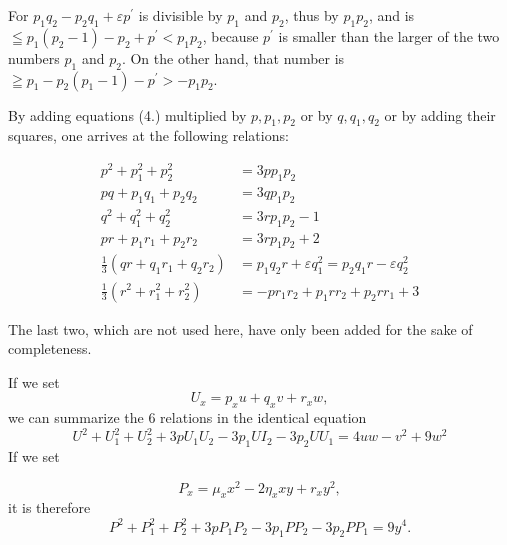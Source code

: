 \documentclass[12pt]{article}
\begin{document}
For $p_{1} q_{2}-p_{2} q_{1}+\varepsilon p^{\prime}$ is divisible by $p_{1}$ and $p_{2}$, thus by $p_{1} p_{2}$, and is $\leqq p_{1}\left(p_{2}-1\right)-p_{2}+p^{\prime}<p_{1} p_{2}$, because $p^{\prime}$ is smaller than the larger of the two numbers $p_{1}$ and $p_{2}$. On the other hand, that number is $\geqq p_{1}-p_{2}\left(p_{1}-1\right)-p^{\prime} >-p_{1} p_{2}$.

By adding equations (4.) multiplied by $p, p_{1}, p_{2}$ or by $q, q_{1}, q_{2}$ or by adding their squares, one arrives at the following relations:

\begin{align*}
p^{2}+p_{1}^{2}+p_{2}^{2} & =3 p p_{1} p_{2} \\
p q+p_{1} q_{1}+p_{2} q_{2} & =3 q p_{1} p_{2} \\
q^{2}+q_{1}^{2}+q_{2}^{2} & =3 r p_{1} p_{2}-1 \\
p r+p_{1} r_{1}+p_{2} r_{2} & =3 r p_{1} p_{2}+2  \tag{5.}\\
\frac{1}{3}\left(q r+q_{1} r_{1}+q_{2} r_{2}\right) & =p_{1} q_{2} r+\varepsilon q_{1}^{2}=p_{2} q_{1} r-\varepsilon q_{2}^{2} \\
\frac{1}{3}\left(r^{2}+r_{1}^{2}+r_{2}^{2}\right) & =-p r_{1} r_{2}+p_{1} r r_{2}+p_{2} r r_{1}+3
\end{align*}

\medskip

The last two, which are not used here, have only been added for the sake of completeness.

If we set
$$U_{x}=p_{x} u+q_{x} v+r_{x} w,$$
we can summarize the 6 relations in the identical equation
\begin{equation*}
U^{2}+U_{1}^{2}+U_{2}^{2}+3 p U_{1} U_{2}-3 p_{1} U I_{2}-3 p_{2} U U_{1}=4 u w-v^{2}+9 w^{2}  \tag{6}
\end{equation*}
If we set

\begin{equation*}
P_{x}=\mu_{x} x^{2}-2 \eta_{x} x y+r_{x} y^{2} , \tag{7.}
\end{equation*}
it is therefore
\begin{equation*}
P^{2}+P_{1}^{2}+P_{2}^{2}+3 p P_{1} P_{2}-3 p_{1} P P_{2}-3 p_{2} P P_{1}=9 y^{4} . \tag{8.}
\end{equation*}
\end{document}

